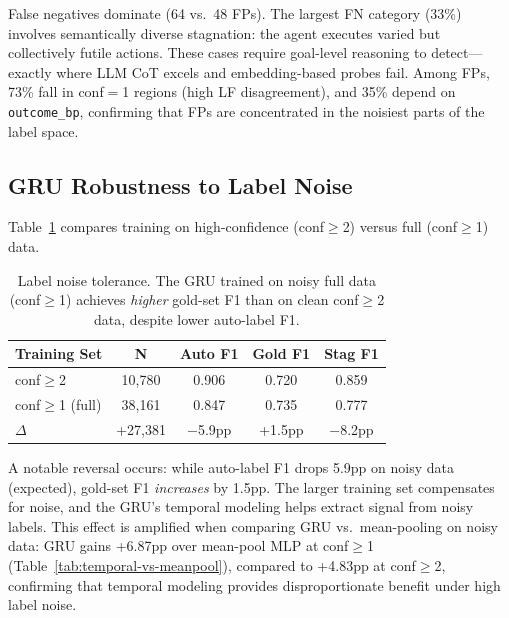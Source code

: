 \documentclass[11pt,a4paper]{article}
\begin{document}
False negatives dominate (64 vs.\ 48 FPs).
The largest FN category (33\%) involves semantically diverse stagnation: the agent executes varied but collectively futile actions.
These cases require goal-level reasoning to detect---exactly where LLM CoT excels and embedding-based probes fail.
Among FPs, 73\% fall in conf${=}$1 regions (high LF disagreement), and 35\% depend on \texttt{outcome\_bp}, confirming that FPs are concentrated in the noisiest parts of the label space.

\subsection{GRU Robustness to Label Noise}
\label{sec:robustness}

Table~\ref{tab:noise-robustness} compares training on high-confidence (conf${\geq}$2) versus full (conf${\geq}$1) data.

\begin{table}[t]
\centering
\small
\begin{tabular}{lcccc}
\toprule
\textbf{Training Set} & \textbf{N} & \textbf{Auto F1} & \textbf{Gold F1} & \textbf{Stag F1} \\
\midrule
conf$\geq$2 & 10,780 & 0.906 & 0.720 & 0.859 \\
conf$\geq$1 (full) & 38,161 & 0.847 & 0.735 & 0.777 \\
$\Delta$ & +27,381 & $-$5.9pp & +1.5pp & $-$8.2pp \\
\bottomrule
\end{tabular}
\caption{Label noise tolerance. The GRU trained on noisy full data (conf$\geq$1) achieves \emph{higher} gold-set F1 than on clean conf$\geq$2 data, despite lower auto-label F1.}
\label{tab:noise-robustness}
\end{table}

A notable reversal occurs: while auto-label F1 drops 5.9pp on noisy data (expected), gold-set F1 \emph{increases} by 1.5pp.
The larger training set compensates for noise, and the GRU's temporal modeling helps extract signal from noisy labels.
This effect is amplified when comparing GRU vs.\ mean-pooling on noisy data: GRU gains +6.87pp over mean-pool MLP at conf${\geq}$1 (Table~\ref{tab:temporal-vs-meanpool}), compared to +4.83pp at conf${\geq}$2, confirming that temporal modeling provides disproportionate benefit under high label noise.
\end{document}
